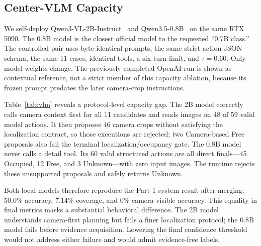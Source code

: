 \documentclass[conference]{IEEEtran}
\begin{document}
\subsection{Center-VLM Capacity}
We self-deploy Qwen3-VL-2B-Instruct~\cite{qwen3vl2025} and Qwen3.5-0.8B~\cite{qwen35model2026} on the same RTX 5090. The 0.8B model is the closest official model to the requested ``0.7B class.'' The controlled pair uses byte-identical prompts, the same strict action JSON schema, the same 11 cases, identical tools, a six-turn limit, and $\tau=0.60$. Only model weights change. The previously completed OpenAI run is shown as contextual reference, not a strict member of this capacity ablation, because its frozen prompt predates the later camera-crop instructions.

Table~\ref{tab:vlm} reveals a protocol-level capacity gap. The 2B model correctly calls camera context first for all 11 candidates and reads images on 48 of 59 valid model actions. It then proposes 46 camera crops without satisfying the localization contract, so those executions are rejected; two Camera-based Free proposals also fail the terminal localization/occupancy gate. The 0.8B model never calls a detail tool. Its 60 valid structured actions are all direct finals---45 Occupied, 12 Free, and 3 Unknown---with zero input images. The runtime rejects these unsupported proposals and safely returns Unknown.

Both local models therefore reproduce the Part 1 system result after merging: 50.0\% accuracy, 7.14\% coverage, and 0\% camera-visible accuracy. This equality in final metrics masks a substantial behavioral difference. The 2B model understands camera-first planning but fails a finer localization protocol; the 0.8B model fails before evidence acquisition. Lowering the final confidence threshold would not address either failure and would admit evidence-free labels.

\begin{table}[t]
\centering
\caption{Center-VLM ablation. OpenAI is contextual only; the two self-deployed rows form the strict model-only comparison.}
\label{tab:vlm}
\footnotesize
{}
\end{table}
\end{document}
